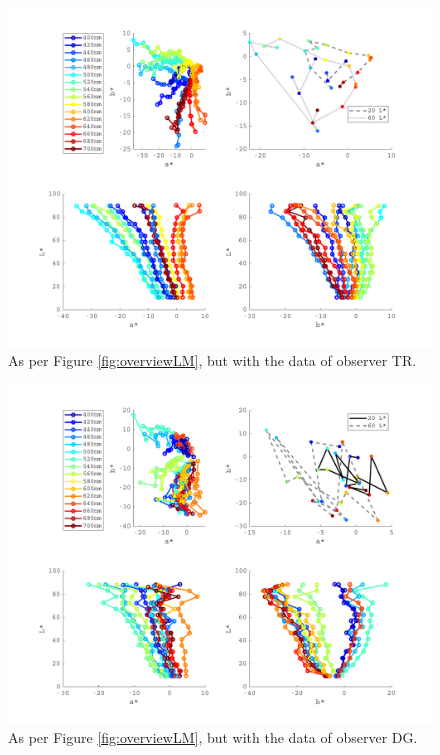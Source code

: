 \begin{figure}[htbp]
\includegraphics[max width=1.2\textwidth, center]{figs/LargeSphere/TRdataOverview.pdf}
\caption{As per Figure \ref{fig:overviewLM}, but with the data of observer TR.}
\label{fig:overviewTR}
\end{figure}

\begin{figure}[htbp]
\includegraphics[max width=1.2\textwidth, center]{figs/LargeSphere/DGdataOverview.pdf}
\caption{As per Figure \ref{fig:overviewLM}, but with the data of observer DG.}
\label{fig:overviewDG}
\end{figure}

